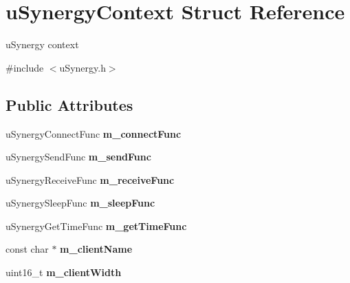 \hypertarget{structu_synergy_context}{}\section{u\+Synergy\+Context Struct Reference}
\label{structu_synergy_context}


u\+Synergy context  




{\ttfamily \#include $<$u\+Synergy.\+h$>$}

\subsection*{Public Attributes}
\begin{DoxyCompactItemize}
\item 
\mbox{\label{structu_synergy_context_a82c7500ffd7648ffc8fa66b5fe032e5e}} 
u\+Synergy\+Connect\+Func {\bfseries m\+\_\+connect\+Func}
\item 
\mbox{\label{structu_synergy_context_a3f8bc41b3649439170d4e7e24c361ae3}} 
u\+Synergy\+Send\+Func {\bfseries m\+\_\+send\+Func}
\item 
\mbox{\label{structu_synergy_context_a7e3510ea31bc9209c13e77390a47fa78}} 
u\+Synergy\+Receive\+Func {\bfseries m\+\_\+receive\+Func}
\item 
\mbox{\label{structu_synergy_context_a9ecdb3601ccd5a0fec540cbd50456492}} 
u\+Synergy\+Sleep\+Func {\bfseries m\+\_\+sleep\+Func}
\item 
\mbox{\label{structu_synergy_context_ab53a26df429df7711cc87634096639f0}} 
u\+Synergy\+Get\+Time\+Func {\bfseries m\+\_\+get\+Time\+Func}
\item 
\mbox{\label{structu_synergy_context_a3f44b4a2f15dd75694100f1e4a7c11cb}} 
const char $\ast$ {\bfseries m\+\_\+client\+Name}
\item 
\mbox{\label{structu_synergy_context_a3aeab114f72f97a05584ae4fda532e6f}} 
uint16\+\_\+t {\bfseries m\+\_\+client\+Width}
\item 
\mbox{\label{structu_synergy_context_a1de0e579731d0ea377c4f3a3216006a8}} 

\end{DoxyCompactItemize}
